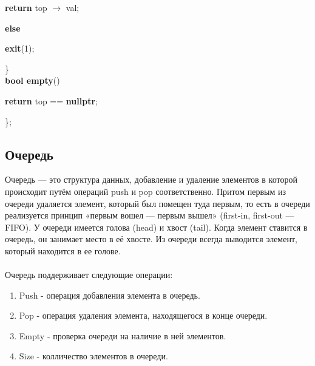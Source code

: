 \begin{algorithm}
\begin{algorithmic}
		\State \hspace{3cm} \textbf{return} top $\rightarrow$ val;

		\State \hspace{2cm} \textbf{else}

		\State \hspace{3cm} \textbf{exit}(1);

		\State \hspace{1cm} \}\\

		\State \hspace{1cm} \textbf{bool empty}() \

		\State \hspace{2cm} \textbf{return} top == \textbf{nullptr};

		\State \};
	\end{algorithmic}
\end{algorithm}




\subsection{Очередь}
\begin{definicion}
	Очередь — это структура данных, добавление и удаление элементов в которой происходит путём операций push и pop соответственно. Притом первым из очереди удаляется элемент, который был помещен туда первым, то есть в очереди реализуется принцип «первым вошел — первым вышел» (first-in, first-out — FIFO). У очереди имеется голова (head) и хвост (tail). Когда элемент ставится в очередь, он занимает место в её хвосте. Из очереди всегда выводится элемент, который находится в ее голове.\\\\ Очередь поддерживает следующие операции:
\end{definicion}

\begin{enumerate}
	\item \begin{definicion}
			  Push - операция добавления элемента в очередь.
	\end{definicion}
	\item \begin{definicion}
			  Pop - операция удаления элемента, находящегося в конце очереди.
	\end{definicion}
	\item \begin{definicion}
			  Empty - проверка очереди на наличие в ней элементов.
	\end{definicion}
	\item \begin{definicion}
			  Size - колличество элементов в очереди.
	\end{definicion}
\end{enumerate}
